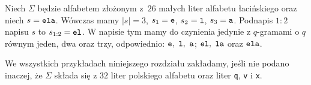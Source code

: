 \documentclass{praca1}
\begin{document}


\begin{example}
Niech $\Sigma$ będzie alfabetem złożonym z~$26$ małych liter alfabetu łacińskiego oraz niech $s = \verb|ela|$. Wówczas mamy $|s| = 3$, $s_1 = \verb|e|$, $s_2 = \verb|l|$, $s_3 = \verb|a|$. Podnapis $1\!\!:\!\!2$ napisu $s$ to $s_{1:2} = \verb|el|$. W napisie tym mamy do czynienia jedynie z $q$-gramami o $q$ równym jeden, dwa oraz trzy, odpowiednio: $\verb|e|,\ \verb|l|,\ \verb|a|$; $\verb|el|,\ \verb|la|$ oraz $\verb|ela|$.
\end{example}


We wszystkich przykładach niniejszego rozdziału zakładamy, jeśli nie podano inaczej, że $\Sigma$ składa się z $32$ liter polskiego alfabetu oraz liter \verb|q|, \verb|v| i \verb|x|.


\end{document}
